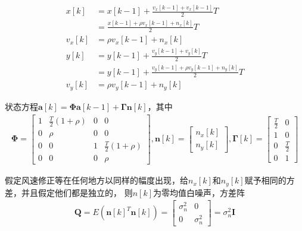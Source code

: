 \documentclass[fontset=windows]{article}
\numberwithin{figure}{section}
\begin{document}
\begin{align*}
    x[k]   & =x[k-1]+\frac{v_x[k-1]+v_x[k-1]}{2}T             \\
           & =\frac{x[k-1]+\rho v_x[k-1]+n_x[k]}{2}T          \\
    v_x[k] & =\rho v_x[k-1]+n_x[k]                            \\
    y[k]   & =y[k-1]+\frac{v_y[k-1]+v_y[k]}{2}T               \\
           & =y[k-1]+\frac{v_y[k-1]+\rho v_y[k-1]+n_y[k]}{2}T \\
    v_y[k] & =\rho v_y[k-1]+n_y[k]
\end{align*}

状态方程\(\mathbf{a}[k]=\boldsymbol{\Phi}\mathbf{a}[k-1]+\mathbf{\Gamma n}[k]\)，其中
\begin{align*}
    \boldsymbol{\Phi}=
    \begin{bmatrix}
        1 & \frac{T}{2}(1+\rho) & 0 & 0                   \\
        0 & \rho                & 0 & 0                   \\
        0 & 0                   & 1 & \frac{T}{2}(1+\rho) \\
        0 & 0                   & 0 & \rho
    \end{bmatrix},
    \mathbf{n}[k]=
    \begin{bmatrix}
        n_x[k] \\
        n_y[k]
    \end{bmatrix},
    \boldsymbol{\Gamma}[k]=
    \begin{bmatrix}
        \frac{T}{2} & 0           \\
        1           & 0           \\
        0           & \frac{T}{2} \\
        0           & 1
    \end{bmatrix}
\end{align*}

假定风速修正等在任何地方以同样的幅度出现，给\(n_x[k]\)和\(n_y[k]\)赋予相同的方差，并且假定他们都是独立的，
则\(n[k]\)为零均值白噪声，方差阵
\begin{align*}
    \mathbf{Q}=E(\mathbf{n}[k]^T\mathbf{n}[k])
    =\begin{bmatrix}
        \sigma^2_n & 0          \\
        0          & \sigma^2_n
    \end{bmatrix}=\sigma^2_n \mathbf{I}
\end{align*}
\end{document}
